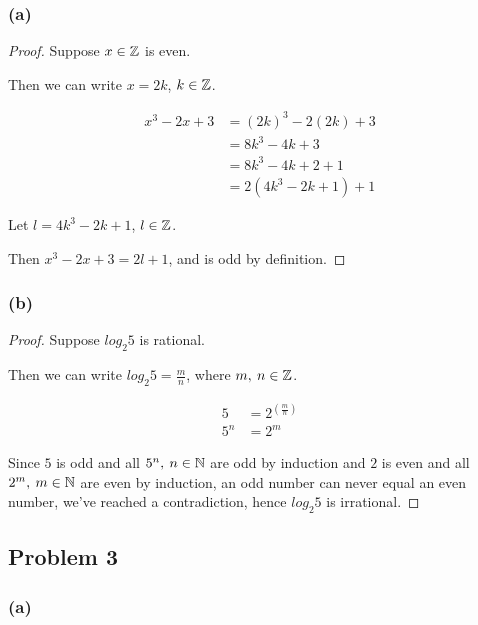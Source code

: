 \documentclass[10pt]{article}
\begin{document}
\subsubsection*{(a)}

\begin{proof}
  Suppose $x \in \mathbb{Z}$ is even.
  \spacing

  \noindent
  Then we can write $x = 2k$, $k \in \mathbb{Z}$.

  \begin{align*}
    x^3 - 2x + 3 &= (2k)^3 - 2(2k) + 3 \\
      &= 8k^3 - 4k + 3 \\
      &= 8k^3 - 4k + 2 + 1 \\
      &= 2(4k^3 - 2k + 1) + 1
  \end{align*}

  \noindent
  Let $l = 4k^3 - 2k + 1$, $l \in \mathbb{Z}$.
  \spacing

  \noindent
  Then $x^3 - 2x + 3 = 2l + 1$, and is odd by definition.
\end{proof}

\subsubsection*{(b)}

\begin{proof}
  Suppose $log_{2}5$ is rational.
  \spacing

  \noindent
  Then we can write $log_{2}5 = \frac{m}{n}$, where $m, \: n \in \mathbb{Z}$.

  \begin{align*}
    5 &= 2^{(\frac{m}{n})} \\
    5^n &= 2^m
  \end{align*}

  \noindent
  Since $5$ is odd and all $5^n, \: n \in \mathbb{N}$ are odd by induction and $2$ is even 
  and all $2^m, \: m \in \mathbb{N}$ are even by induction, an odd number can never equal an even number, 
  we've reached a contradiction, hence $log_{2}5$ is irrational.
\end{proof}

\newpage
\subsection*{Problem 3}

\subsubsection*{(a)}
\end{document}
